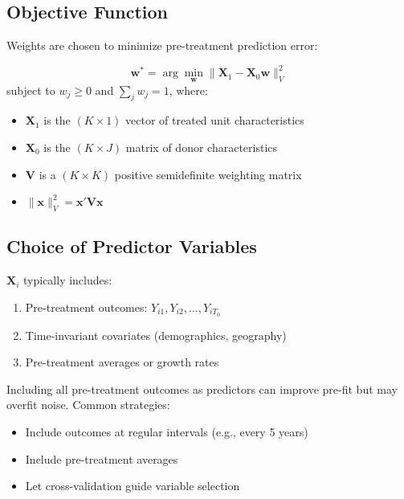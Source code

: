 \subsection{Objective Function}

Weights are chosen to minimize pre-treatment prediction error:

\begin{definition}
\label{def:scm_optimization}
\begin{equation}
    \mathbf{w}^* = \arg\min_{\mathbf{w}} \|\mathbf{X}_1 - \mathbf{X}_0 \mathbf{w}\|_V^2
    \label{eq:scm_objective}
\end{equation}
subject to $w_j \geq 0$ and $\sum_j w_j = 1$, where:
\begin{itemize}
    \item $\mathbf{X}_1$ is the $(K \times 1)$ vector of treated unit characteristics
    \item $\mathbf{X}_0$ is the $(K \times J)$ matrix of donor characteristics
    \item $\mathbf{V}$ is a $(K \times K)$ positive semidefinite weighting matrix
    \item $\|\mathbf{x}\|_V^2 = \mathbf{x}' \mathbf{V} \mathbf{x}$
\end{itemize}
\end{definition}

\subsection{Choice of Predictor Variables}

$\mathbf{X}_i$ typically includes:
\begin{enumerate}
    \item Pre-treatment outcomes: $Y_{i1}, Y_{i2}, \ldots, Y_{iT_0}$
    \item Time-invariant covariates (demographics, geography)
    \item Pre-treatment averages or growth rates
\end{enumerate}

\begin{remark}
Including all pre-treatment outcomes as predictors can improve pre-fit but may overfit noise. Common strategies:
\begin{itemize}
    \item Include outcomes at regular intervals (e.g., every 5 years)
    \item Include pre-treatment averages
    \item Let cross-validation guide variable selection
\end{itemize}
\end{remark}

